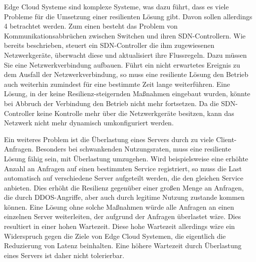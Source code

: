 Edge Cloud Systeme sind komplexe Systeme, was dazu führt, dass es viele Probleme für die Umsetzung einer resilienten Lösung gibt. Davon sollen allerdings 4 betrachtet werden.
Zum einen besteht das Problem von Kommunikationsabbrüchen zwischen Switchen und ihren \ac{SDN}-Controllern. Wie bereits beschrieben, steuert ein \ac{SDN}-Controller die ihm zugewiesenen Netzwerkgeräte, 
überwacht diese und aktualisiert ihre Flussregeln. Dazu müssen Sie eine Netzwerkverbindung aufbauen. Führt ein nicht erwartetes Ereignis zu dem Ausfall der Netzwerkverbindung, 
so muss eine resiliente Lösung den Betrieb auch weiterhin zumindest für eine bestimmte Zeit lange weiterführen. Eine Lösung, in der keine Resilienz-steigernden Maßnahmen eingebaut wurden, 
könnte bei Abbruch der Verbindung den Betrieb nicht mehr fortsetzen. Da die \ac{SDN}-Controller keine Kontrolle mehr über die Netzwerkgeräte besitzen, kann das Netzwerk nicht mehr dynamisch umkonfiguriert werden.

Ein weiteres Problem ist die Überlastung eines Servers durch zu viele Client-Anfragen. Besonders bei schwankenden Nutzungsraten, muss eine resiliente Lösung fähig sein, mit Überlastung umzugehen. 
Wird beispielsweise eine erhöhte Anzahl an Anfragen auf einen bestimmten Service registriert, so muss die Last automatisch auf verschiedene Server aufgeteilt werden, die den gleichen Service anbieten. 
Dies erhöht die Resilienz gegenüber einer großen Menge an Anfragen, die durch \ac{DDOS}-Angriffe, aber auch durch legitime Nutzung zustande kommen können. 
Eine Lösung ohne solche Maßnahmen würde alle Anfragen an einen einzelnen Server weiterleiten, der aufgrund der Anfragen überlastet wäre. Dies resultiert in einer hohen Wartezeit. 
Diese hohe Wartezeit allerdings wäre ein Widerspruch gegen die Ziele von Edge Cloud Systemen, die eigentlich die Reduzierung von Latenz beinhalten. 
Eine höhere Wartezeit durch Überlastung eines Servers ist daher nicht tolerierbar.

